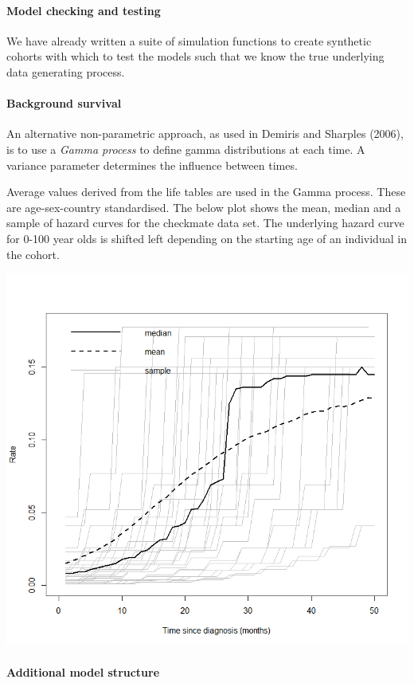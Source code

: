 \documentclass[
]{article}
\begin{document}
\hypertarget{model-checking-and-testing}{%
\paragraph{Model checking and
testing}\label{model-checking-and-testing}}

We have already written a suite of simulation functions to create
synthetic cohorts with which to test the models such that we know the
true underlying data generating process.

\hypertarget{background-survival-1}{%
\paragraph{Background survival}\label{background-survival-1}}

An alternative non-parametric approach, as used in Demiris and Sharples
(2006), is to use a \emph{Gamma process} to define gamma distributions
at each time. A variance parameter determines the influence between
times.

Average values derived from the life tables are used in the Gamma
process. These are age-sex-country standardised. The below plot shows
the mean, median and a sample of hazard curves for the checkmate data
set. The underlying hazard curve for 0-100 year olds is shifted left
depending on the starting age of an individual in the cohort.

\begin{center}\includegraphics[width=0.6\linewidth]{../docs/background_average_rate_plot} \end{center}

\hypertarget{additional-model-structure}{%
\paragraph{Additional model
structure}\label{additional-model-structure}}
\end{document}
